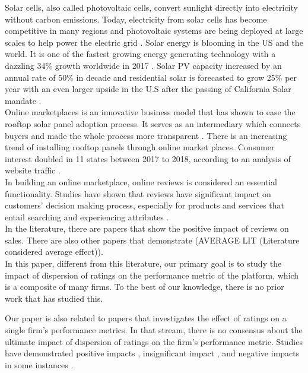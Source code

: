 \documentclass[msom,blindrev]{informs3}
\begin{document}
Solar cells, also called photovoltaic cells, convert sunlight directly into electricity without carbon emissions. Today, electricity from solar cells has become competitive in many regions and photovoltaic systems are being deployed at large scales to help power the electric grid \citep{nrel.gov}. 
Solar energy is blooming in the US and the world. It is one of the fastest growing energy generating technology with a dazzling 34\% growth worldwide in 2017 \citep{iea2018snapshot}. Solar PV capacity increased by an annual rate of 50\%  in decade and residential solar is forecasted to grow 25\% per year \citep{weaver_2019,seia} with an even larger upside in the U.S after the passing of California Solar mandate \citep{gtmsolar2018}. \\ 
Online marketplaces is an innovative business model that has shown to ease the rooftop solar panel adoption process. It serves as an intermediary which connects buyers and made the whole process more transparent \citep{dorsey2019access}. There is an increasing trend of installing rooftop panels through online market places. Consumer interest doubled in 11 states between 2017 to 2018, according to an analysis of website traffic \citep{energysageintel19}.  \\
In building an online marketplace, online reviews is considered an essential functionality. Studies have shown that reviews have significant impact on customers'  decision making process, especially for products and services that entail searching and experiencing attributes \citep{zimmermann2018decomposing}.  \\
In the literature, there are papers that show the positive impact of reviews on sales. There are also other papers that demonstrate  (AVERAGE LIT (Literature considered average effect)).\\
In this paper, different from this literature, our primary goal is to study the impact of dispersion of ratings on the  performance metric of the platform, which is a composite of many firms. To the best of our knowledge, there is no prior work that has studied this. 

Our paper is also related to papers that investigates the effect of ratings on a single firm's performance metrics. In that stream, there is no consensus about the ultimate impact of dispersion of ratings on the firm's performance metric. Studies have demonstrated positive impacts \citep{chintagunta2010effects,chevalier2006effect,dellarocas2007exploring}, insignificant impact \citep{duan2008online}, and negative impacts in some instances \citep{wang2015user}. 
\end{document}
